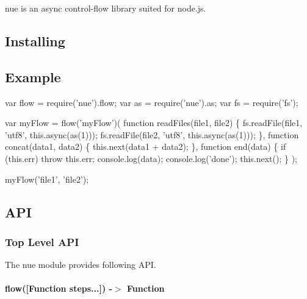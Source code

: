 nue is an async control-\/flow library suited for node.\+js.

\subsection*{Installing}




\subsection*{Example}


\begin{DoxyCode}
var flow = require(\textcolor{stringliteral}{'nue'}).flow;
var as = require(\textcolor{stringliteral}{'nue'}).as;
var fs = require(\textcolor{stringliteral}{'fs'});

var myFlow = flow(\textcolor{stringliteral}{'myFlow'})(
  \textcolor{keyword}{function} readFiles(file1, file2) \{
    fs.readFile(file1, \textcolor{stringliteral}{'utf8'}, this.async(as(1)));
    fs.readFile(file2, \textcolor{stringliteral}{'utf8'}, this.async(as(1)));
  \},
  \textcolor{keyword}{function} concat(data1, data2) \{
    this.next(data1 + data2);
  \},
  \textcolor{keyword}{function} end(data) \{
    \textcolor{keywordflow}{if} (this.err) \textcolor{keywordflow}{throw} this.err;
    console.log(data);
    console.log(\textcolor{stringliteral}{'done'});
    this.next();
  \}
);

myFlow(\textcolor{stringliteral}{'file1'}, \textcolor{stringliteral}{'file2'});
\end{DoxyCode}


\subsection*{A\+P\+I}

\subsubsection*{Top Level A\+P\+I}

The {\ttfamily nue} module provides following A\+P\+I.

\paragraph*{flow(\mbox{[}Function steps...\mbox{]}) -\/$>$ Function}

